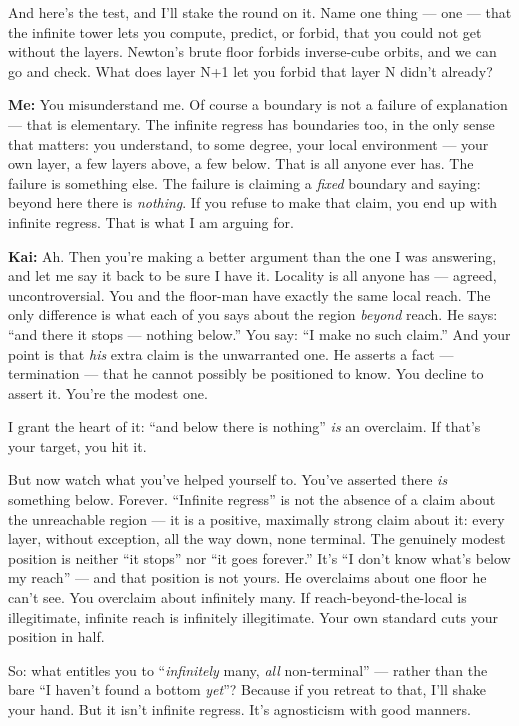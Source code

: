 \documentclass[fontsize=11pt,paper=a4,pagesize=auto,parskip=half-]{scrbook}
\newcommand{\speaker}[1]{\par\noindent\textbf{#1:}\hspace{0.6em}}
\begin{document}
And here's the test, and I'll stake the round on it. Name one thing --- one --- that the infinite tower lets you compute, predict, or forbid, that you could not get without the layers. Newton's brute floor forbids inverse-cube orbits, and we can go and check. What does layer N+1 let you forbid that layer N didn't already?

\speaker{Me} You misunderstand me. Of course a boundary is not a failure of explanation --- that is elementary. The infinite regress has boundaries too, in the only sense that matters: you understand, to some degree, your local environment --- your own layer, a few layers above, a few below. That is all anyone ever has. The failure is something else. The failure is claiming a \emph{fixed} boundary and saying: beyond here there is \emph{nothing}. If you refuse to make that claim, you end up with infinite regress. That is what I am arguing for.

\speaker{Kai} Ah. Then you're making a better argument than the one I was answering, and let me say it back to be sure I have it. Locality is all anyone has --- agreed, uncontroversial. You and the floor-man have exactly the same local reach. The only difference is what each of you says about the region \emph{beyond} reach. He says: ``and there it stops --- nothing below.'' You say: ``I make no such claim.'' And your point is that \emph{his} extra claim is the unwarranted one. He asserts a fact --- termination --- that he cannot possibly be positioned to know. You decline to assert it. You're the modest one.

I grant the heart of it: ``and below there is nothing'' \emph{is} an overclaim. If that's your target, you hit it.

But now watch what you've helped yourself to. You've asserted there \emph{is} something below. Forever. ``Infinite regress'' is not the absence of a claim about the unreachable region --- it is a positive, maximally strong claim about it: every layer, without exception, all the way down, none terminal. The genuinely modest position is neither ``it stops'' nor ``it goes forever.'' It's ``I don't know what's below my reach'' --- and that position is not yours. He overclaims about one floor he can't see. You overclaim about infinitely many. If reach-beyond-the-local is illegitimate, infinite reach is infinitely illegitimate. Your own standard cuts your position in half.

So: what entitles you to ``\emph{infinitely} many, \emph{all} non-terminal'' --- rather than the bare ``I haven't found a bottom \emph{yet}''? Because if you retreat to that, I'll shake your hand. But it isn't infinite regress. It's agnosticism with good manners.
\end{document}
